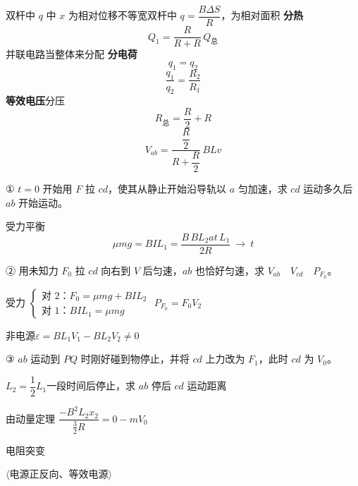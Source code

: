 双杆中 $q$ 中 $x$ 为相对位移\quad 不等宽双杆中 $q=\dfrac{B\Delta S}{R}$，为相对面积 %
\textbf{分热}
\[ Q_1=\frac{R}{R+R}\,Q_{\text{总}} \]
并联电路当整体来分配 %
\textbf{分电荷}
\[ q_1=q_2 \]
\[ \frac{q_1}{q_2}=\frac{R_2}{R_1} \]
\textbf{等效电压}\quad 分压
\[ R_{\text{总}}=\frac{R}{2}+R \]
\[ V_{ab}=\frac{\dfrac{R}{2}}{R+\dfrac{R}{2}}\,BLv \]
\begin{problem}
① $t=0$ 开始用 $F$ 拉 $cd$，使其从静止开始沿导轨以 $a$ 匀加速，求 $cd$ 运动多久后 $ab$ 开始运动。
\begin{solution}
受力平衡 %
\[ \mu mg=BIL_1=\frac{B\,BL_2at\,L_1}{2R}\ \to\ t \]
\end{solution}
② 用未知力 $F_0$ 拉 $cd$ 向右到 $V$ 后匀速，$ab$ 也恰好匀速，求 $V_{ab}$　$V_{cd}$　$P_{F_0}$。
\begin{solution}
受力 $\left\{\begin{array}{l}\text{对 2：}F_0=\mu mg+BIL_2\\ \text{对 1：}BIL_1=\mu mg\end{array}\right.$ \qquad $P_{F_0}=F_0V_2$

非电源\quad $\varepsilon=BL_1V_1-BL_2V_2\neq 0$ %
\end{solution}
③ $ab$ 运动到 $PQ$ 时刚好碰到物停止，并将 $cd$ 上力改为 $F_1$，此时 $cd$ 为 $V_0$。

$L_2=\dfrac{1}{2}L_1$\qquad 一段时间后停止，求 $ab$ 停后 $cd$ 运动距离
\begin{solution}
由动量定理 \quad $\dfrac{-B^2L_2x_2}{\frac{3}{2}R}=0-mV_0$

电阻突变
\end{solution}
\end{problem}
$\langle$电源正反向、等效电源$\rangle$

